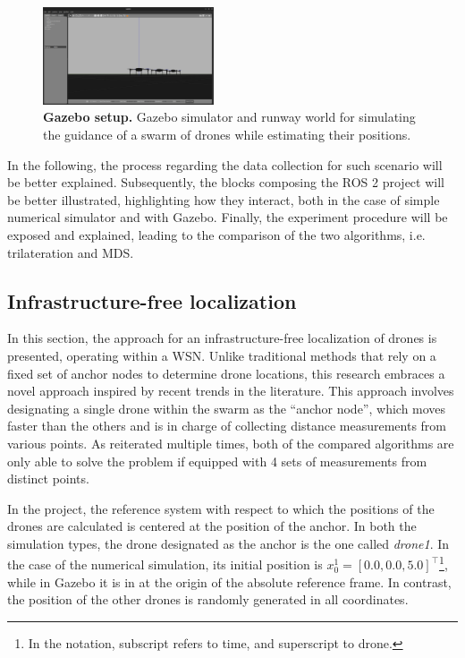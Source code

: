 \begin{figure}[!ht]
  \begin{center}    
    \includegraphics[width=0.45\textwidth]{figures/gazebo-environment.png}
  \end{center}
  \caption[Gazebo setup]{
    \textbf{Gazebo setup.} 
    Gazebo simulator and runway world for simulating the guidance of a swarm of drones while estimating their positions.
  }
  \label{fig:gazebo_setup}
\end{figure}

In the following, the process regarding the data collection for such scenario will be better explained. Subsequently, the blocks composing the ROS 2 project will be better illustrated, highlighting how they interact, both in the case of simple numerical simulator and with Gazebo. Finally, the experiment procedure will be exposed and explained, leading to the comparison of the two algorithms, i.e. trilateration and MDS.



\subsection{Infrastructure-free localization}
In this section, the approach for an infrastructure-free localization of drones is presented, operating within a WSN. 
Unlike traditional methods that rely on a fixed set of anchor nodes to determine drone locations, this research embraces a novel approach inspired by recent trends in the literature. This approach involves designating a single drone within the swarm as the “anchor node”, which moves faster than the others and is in charge of collecting distance measurements from various points.
As reiterated multiple times, both of the compared algorithms are only able to solve the problem if equipped with 4 sets of measurements from distinct points. 

In the project, the reference system with respect to which the positions of the drones are calculated is centered at the position of the anchor. In both the simulation types, the drone designated as the anchor is the one called \textit{drone1}. In the case of the numerical simulation, its initial position is $x_0^1=[0.0,0.0,5.0]^\top$\footnote{In the notation, subscript refers to time, and superscript to drone.}, while in Gazebo it is in at the origin of the absolute reference frame. 
In contrast, the position of the other drones is randomly generated in all coordinates. \par

